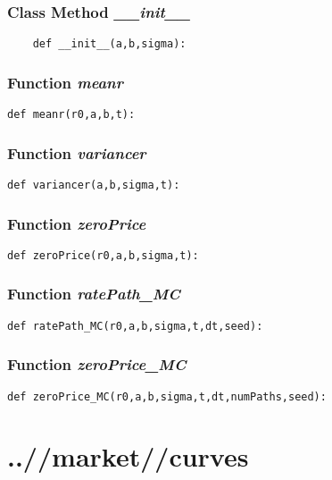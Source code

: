 \documentclass[twoside,11pt]{book}
\begin{document}
\subsection{Class Method {\it \_\_init\_\_}}


\begin{lstlisting}
    def __init__(a,b,sigma):
\end{lstlisting}

\subsection{Function {\it meanr}}


\begin{lstlisting}
def meanr(r0,a,b,t):
\end{lstlisting}

\subsection{Function {\it variancer}}


\begin{lstlisting}
def variancer(a,b,sigma,t):
\end{lstlisting}

\subsection{Function {\it zeroPrice}}


\begin{lstlisting}
def zeroPrice(r0,a,b,sigma,t):
\end{lstlisting}

\subsection{Function {\it ratePath\_MC}}


\begin{lstlisting}
def ratePath_MC(r0,a,b,sigma,t,dt,seed):
\end{lstlisting}

\subsection{Function {\it zeroPrice\_MC}}


\begin{lstlisting}
def zeroPrice_MC(r0,a,b,sigma,t,dt,numPaths,seed):
\end{lstlisting}


\chapter{..//market//curves}
\end{document}
